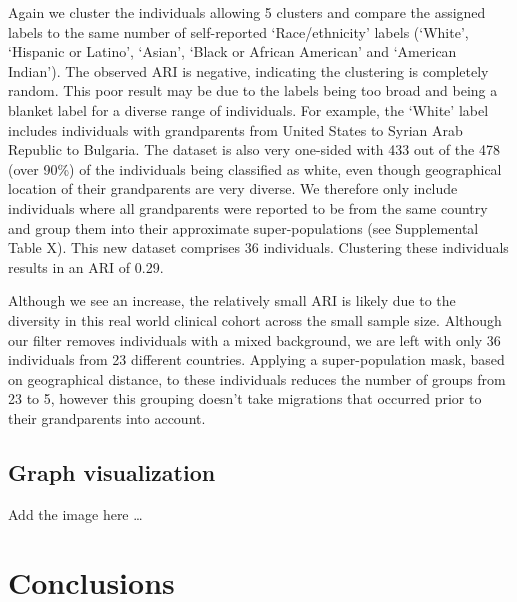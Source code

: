 \documentclass{bmcart}
\begin{document}
Again we cluster the individuals allowing 5 clusters and compare the assigned labels to the same number of self-reported `Race/ethnicity' labels (`White', `Hispanic or Latino', `Asian', `Black or African American' and `American Indian').
The observed ARI is negative, indicating the clustering is completely random. 
This poor result may be due to the labels being too broad and being a blanket label for a diverse range of individuals. For example, the `White' label includes individuals with grandparents from United States to Syrian Arab Republic to Bulgaria.
The dataset is also very one-sided with 433 out of the 478 (over 90\%) of the individuals being classified as white, even though geographical location of their grandparents are very diverse.
We therefore only include individuals where all grandparents were reported to be from the same country and group them into their approximate super-populations (see Supplemental Table X). 
This new dataset comprises 36 individuals.
Clustering these individuals results in an ARI of 0.29. 

Although we see an increase, the relatively small ARI is likely due to the diversity in this real world clinical cohort across the small sample size. Although our filter removes individuals with a mixed background, we are left with only 36 individuals from 23 different countries.
Applying a super-population mask, based on geographical distance, to these individuals reduces the number of groups from 23 to 5, however this grouping doesn't take migrations that occurred prior to their grandparents into account. 


\subsection*{Graph visualization}
Add the image here \ldots




\section*{Conclusions}
\end{document}
